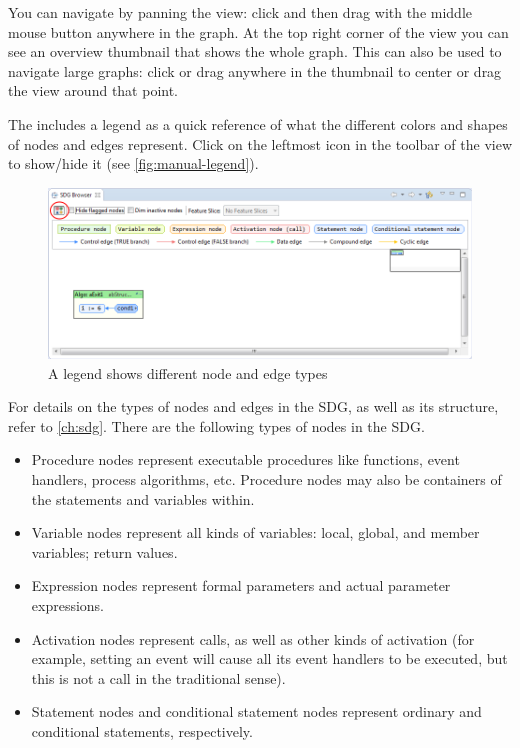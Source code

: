 You can navigate by panning the view: click and then drag with the middle mouse button anywhere in the graph. At the 
top right corner of the \SB view you can see an overview thumbnail that shows the whole graph. This can also be used to 
navigate large graphs: click or drag anywhere in the thumbnail to center or drag the view around that point.

The \SB includes a legend as a quick reference of what the different colors and shapes of nodes and edges represent. 
Click on the leftmost icon in the toolbar of the \SB view to show/hide it (see \autoref{fig:manual-legend}).

\begin{figure}[hp]
  \centering
    \includegraphics[width=\textwidth]{bilder/manual-legend}
  \caption{A legend shows different node and edge types}
  \label{fig:manual-legend}
\end{figure}

For details on the types of nodes and edges in the SDG, as well as its structure, refer to \autoref{ch:sdg}. There are 
the following types of nodes in the SDG.

\begin{itemize}
  \item Procedure nodes represent executable procedures like functions, event handlers, process algorithms, etc. 
  Procedure nodes may also be containers of the statements and variables within.
  
  \item Variable nodes represent all kinds of variables: local, global, and member variables; return values.
  
  \item Expression nodes represent formal parameters and actual parameter expressions.
  
  \item Activation nodes represent calls, as well as other kinds of activation (for example, setting an event will 
  cause all its event handlers to be executed, but this is not a call in the traditional sense).
  
  \item Statement nodes and conditional statement nodes represent ordinary and conditional statements, respectively.
\end{itemize}

